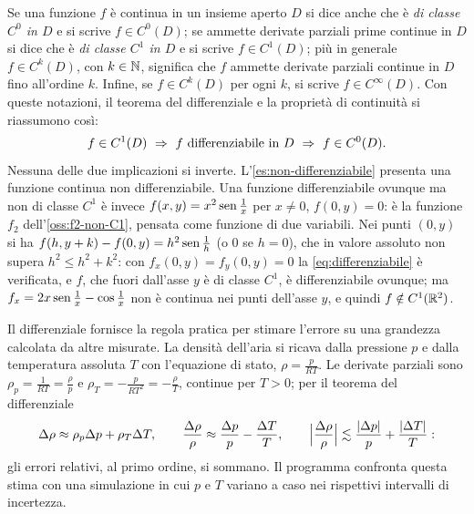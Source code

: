 Se una funzione $f$ è continua in un insieme aperto $D$ si dice anche che è \emph{di
classe $C^{0}$ in $D$} e si scrive $f\in C^{0}(D)$; se ammette derivate parziali prime
continue in $D$ si dice che è \emph{di classe $C^{1}$ in $D$} e si scrive $f\in C^{1}(D)$;
più in generale $f\in C^{k}(D)$, con $k\in\mathbb{N}$, significa che $f$ ammette derivate
parziali continue in $D$ fino all'ordine $k$. Infine, se $f\in C^{k}(D)$ per ogni $k$, si
scrive $f\in C^{\infty}(D)$. Con queste notazioni, il teorema del differenziale e la
proprietà di continuità si riassumono così:
\begin{equation}\label{eq:classi-differenziabilita}
  f\in C^{1}(D)\ \implica\ f \text{ differenziabile in } D\ \implica\ f\in C^{0}(D).
\end{equation}
Nessuna delle due implicazioni si inverte. L'\cref{es:non-differenziabile} presenta una
funzione continua non differenziabile. Una funzione differenziabile ovunque ma non di
classe $C^{1}$ è invece $f(x,y)=x^{2}\operatorname{sen}\frac1x$ per $x\neq0$, $f(0,y)=0$: è la funzione $f_{2}$
dell'\cref{oss:f2-non-C1}, pensata come funzione di due variabili. Nei punti $(0,y)$ si ha
$f(h,y+k)-f(0,y)=h^{2}\operatorname{sen}\frac1h$ (o $0$ se $h=0$), che in valore assoluto non supera
$h^{2}\le h^{2}+k^{2}$: con $f_{x}(0,y)=f_{y}(0,y)=0$ la \eqref{eq:differenziabile} è verificata, e
$f$, che fuori dall'asse $y$ è di classe $C^{1}$, è differenziabile ovunque; ma $f_{x}=2x\operatorname{sen}\frac1x-\cos\frac1x$ non è continua nei
punti dell'asse $y$, e quindi $f\notin C^{1}(\mathbb{R}^{2})$.

\begin{esempio}\label{es:propagazione-errori}
Il differenziale fornisce la regola pratica per stimare l'errore su una grandezza
calcolata da altre misurate. La densità dell'aria si ricava dalla pressione $p$ e dalla
temperatura assoluta $T$ con l'equazione di stato, $\rho=\frac p{RT}$. Le derivate
parziali sono $\rho_{p}=\frac1{RT}=\frac\rho p$ e $\rho_{T}=-\frac p{RT^{2}}=-\frac\rho T$, continue
per $T>0$; per il teorema del differenziale
\[
  \Delta\rho\approx\rho_{p}\Delta p+\rho_{T}\Delta T, \qquad
  \frac{\Delta\rho}{\rho}\approx\frac{\Delta p}{p}-\frac{\Delta T}{T}, \qquad
  \Bigl|\frac{\Delta\rho}{\rho}\Bigr|\lesssim\frac{\lvert \Delta p\rvert}{p}+\frac{\lvert \Delta T\rvert}{T} :
\]
gli errori relativi, al primo ordine, si sommano. Il programma confronta questa stima
con una simulazione in cui $p$ e $T$ variano a caso nei rispettivi intervalli di
incertezza.
\end{esempio}

